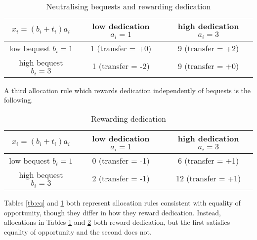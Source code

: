 \begin{table}[H]
	\caption{Neutralising bequests and rewarding dedication}
	\label{tb:eq2}
	\begin{center}
		\begin{tabular}{ |c|cc| }
			\hline
			\( x_i = ( b_i + t_i )a_i \) & low dedication \( a_i = 1 \) & high dedication \( a_i = 3 \) \\
			\hline
			low bequest \( b_i = 1 \)    & 1 (transfer = +0)            & 9     (transfer = +2)         \\
			high bequest \( b_i = 3 \)   & 1   (transfer = -2)          & 9    (transfer = +0)          \\
			\hline
		\end{tabular}
	\end{center}
\end{table}

A third allocation rule which rewards dedication independently of bequests is the following.

\begin{table}[H]
	\caption{Rewarding dedication}
	\label{tb:rew}
	\begin{center}
		\begin{tabular}{ |c|cc| }
			\hline
			\( x_i = ( b_i + t_i )a_i \) & low dedication \( a_i = 1 \) & high dedication \( a_i = 3 \) \\
			\hline
			low bequest \( b_i = 1 \)    & 0 (transfer = -1)            & 6      (transfer = +1)        \\
			high bequest \( b_i = 3 \)   & 2   (transfer = -1)          & 12    (transfer = +1)         \\
			\hline
		\end{tabular}
	\end{center}
\end{table}

Tables \ref{tb:eq} and \ref{tb:eq2} both represent allocation rules consistent with equality of opportunity, though they differ in how they reward dedication. Instead, allocations in Tables \ref{tb:eq2} and \ref{tb:rew} both reward dedication, but the first satisfies equality of opportunity and the second does not.

